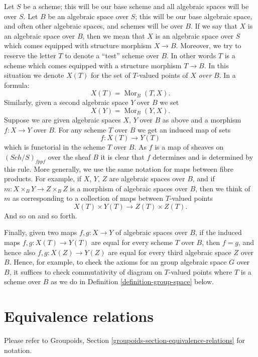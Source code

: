 \documentclass{stacks-project}
\theoremstyle{plain}
\theoremstyle{definition}
\theoremstyle{remark}
\numberwithin{equation}{subsection}
\def\Sch{\mathit{Sch}}
\def\Mor{\mathop{\mathrm{Mor}}\nolimits}
\begin{document}
\noindent
Let $S$ be a scheme; this will be our base scheme and all algebraic spaces
will be over $S$. Let $B$ be an algebraic space over $S$; this will be our
base algebraic space, and often other algebraic spaces, and schemes will
be over $B$. If we say that $X$ is an algebraic space over $B$, then we
mean that $X$ is an algebraic space over $S$ which comes equipped with
structure morphism $X \to B$. Moreover, we try to reserve the letter $T$
to denote a ``test'' scheme over $B$. In other words $T$ is a scheme
which comes equipped with a structure morphism $T \to B$.
In this situation we denote $X(T)$ for the set of $T$-valued points of
$X$ {\it over} $B$. In a formula:
$$
X(T) = \Mor_B(T, X).
$$
Similarly, given a second algebraic space $Y$ over $B$ we set
$$
X(Y) = \Mor_B(Y, X).
$$
Suppose we are given algebraic spaces $X$, $Y$ over $B$ as above and a
morphism $f : X \to Y$ over $B$. For any scheme $T$ over $B$ we get an
induced map of sets
$$
f : X(T) \longrightarrow Y(T)
$$
which is functorial in the scheme $T$ over $B$.
As $f$ is a map of sheaves on $(\Sch/S)_{fppf}$ over the
sheaf $B$ it is clear that $f$ determines and is determined by this rule.
More generally, we use the same notation for maps between fibre
products. For example, if
$X$, $Y$, $Z$ are algebraic spaces over $B$, and if
$m : X \times_B Y \to Z \times_B Z$ is
a morphism of algebraic spaces over $B$, then we think of $m$ as corresponding
to a collection of maps between $T$-valued points
$$
X(T) \times Y(T) \longrightarrow Z(T) \times Z(T).
$$
And so on and so forth.

\medskip\noindent
Finally, given two maps
$f, g : X \to Y$ of algebraic spaces over $B$, if the induced maps
$f, g : X(T) \to Y(T)$ are equal for every scheme $T$ over $B$, then
$f = g$, and hence also $f, g : X(Z) \to Y(Z)$ are equal for
every third algebraic space $Z$ over $B$. Hence, for example,
to check the axioms for an group algebraic space $G$ over $B$, it
suffices to check commutativity of diagram on $T$-valued points
where $T$ is a scheme over $B$ as we do in
Definition \ref{definition-group-space}
below.




\section{Equivalence relations}
\label{section-equivalence-relations}

\noindent
Please refer to
Groupoids, Section \ref{groupoids-section-equivalence-relations}
for notation.
\end{document}
